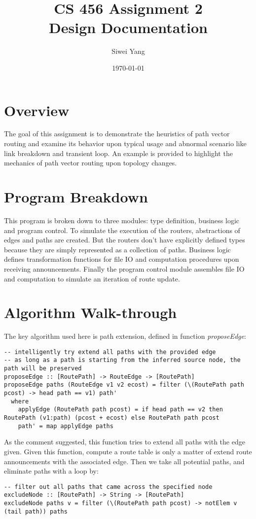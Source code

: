 \documentclass[12pt]{article}
\begin{document}
\title{CS 456 Assignment 2\\Design Documentation}
\date{\today}
\author{Siwei Yang}
\maketitle

\section{Overview}
The goal of this assignment is to demonstrate the heuristics of path vector routing and examine its behavior upon typical usage and abnormal scenario like link breakdown and transient loop. An example is provided to highlight the mechanics of path vector routing upon topology changes.

\section{Program Breakdown}
This program is broken down to three modules: type definition, business logic and program control. To simulate the execution of the routers, abstractions of edges and paths are created. But the routers don't have explicitly defined types because they are simply represented as a collection of paths. Business logic defines transformation functions for file IO and computation procedures upon receiving announcements. Finally the program control module assembles file IO and computation to simulate an iteration of route update.

\section{Algorithm Walk-through}
The key algorithm used here is path extension, defined in function \textit{proposeEdge}:

\begin{lstlisting}
-- intelligently try extend all paths with the provided edge
-- as long as a path is starting from the inferred source node, the path will be preserved
proposeEdge :: [RoutePath] -> RouteEdge -> [RoutePath]
proposeEdge paths (RouteEdge v1 v2 ecost) = filter (\(RoutePath path pcost) -> head path == v1) path'
  where
    applyEdge (RoutePath path pcost) = if head path == v2 then RoutePath (v1:path) (pcost + ecost) else RoutePath path pcost
    path' = map applyEdge paths
\end{lstlisting}

As the comment suggested, this function tries to extend all paths with the edge given. Given this function, compute a route table is only a matter of extend route announcements with the associated edge. Then we take all potential paths, and eliminate paths with a loop by:
\begin{lstlisting}
-- filter out all paths that came across the specified node
excludeNode :: [RoutePath] -> String -> [RoutePath]
excludeNode paths v = filter (\(RoutePath path pcost) -> notElem v (tail path)) paths
\end{lstlisting}
\end{document}
